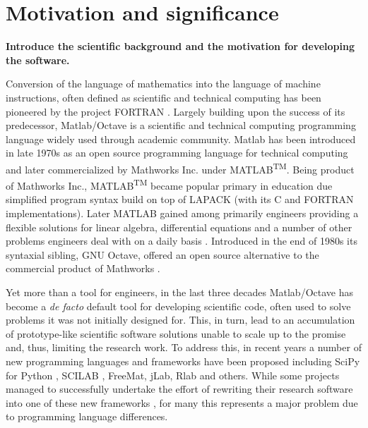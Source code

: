 \section{Motivation and significance}

\textbf{Introduce the scientific background and the motivation for developing the software.}

Conversion of the language of mathematics into the language of machine instructions, often defined as scientific and technical computing has been pioneered by the project FORTRAN \cite{Backus:1957:FAC}. Largely building upon the success of its predecessor, Matlab/Octave is a scientific and technical computing programming language widely used through academic community. Matlab has been introduced in late 1970s as an open source programming language for technical computing and later commercialized by Mathworks Inc. under MATLAB\textsuperscript{TM}. Being product of Mathworks Inc., MATLAB\textsuperscript{TM} became popular primary in education due simplified program syntax build on top of LAPACK (with its C and FORTRAN implementations). Later MATLAB gained among primarily engineers providing a flexible solutions for linear algebra, differential equations and a number of other problems engineers deal with on a daily basis \cite{moore2014matlab}. Introduced in the end of 1980s its syntaxial sibling, GNU Octave, offered an open source alternative to the commercial product of Mathworks \cite{eaton1997gnu}.

Yet more than a tool for engineers, in the last three decades Matlab/Octave has become a \textit{de facto} default tool for developing scientific code, often used to solve problems it was not initially designed for. This, in turn, lead to an accumulation of prototype-like scientific software solutions unable to scale up to the promise and, thus, limiting the research work. To address this, in recent years a number of new programming languages and frameworks have been proposed including SciPy for Python \cite{jones2001open, Olivier_2002}, SCILAB \cite{Campbell_2009}, FreeMat, jLab, Rlab and others. While some projects managed to successfully undertake the effort of rewriting their research software into one of these new frameworks \cite{17076895, 21349861}, for many this represents a major problem due to programming language differences.

